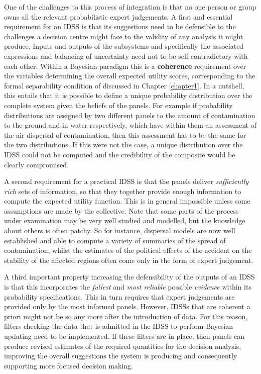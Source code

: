  One of the challenges to  this process of integration is that no one person or group owns all the relevant probabilistic expert judgements. A first and essential requirement for an IDSS is that its suggestions need to be defensible to the challenges a decision centre might face to the validity of any analysis it might produce. Inputs and outputs of the subsystems and specifically the associated expressions and balancing of uncertainty need not to be self contradictory with each other. Within a Bayesian paradigm this is a \textbf{coherence} requirement over the variables determining the overall expected utility scores, corresponding to the formal separability condition of \citet{Mahoney1996} discussed in Chapter \ref{chapter1}. In a nutshell, this entails that it is possible to define a unique probability distribution over the complete system given the beliefs of the panels. For example if  probability distributions are assigned by two different panels to the amount of contamination to the ground and in water respectively, which have within them an assessment of the air dispersal of contamination, then this assessment has to be the same for the two distributions. If this were not the case, a unique distribution over the IDSS could not be computed and the credibility of the composite would be clearly compromised. 

A second requirement for a practical IDSS is that the panels deliver \textit{sufficiently rich} sets of information, so that they together provide enough information to compute the expected utility function. This is in general impossible unless some assumptions are made by the collective. Note that some parts of the process under examination may be very well studied and modelled, but the knowledge about others is often patchy. So for instance, dispersal models are now well established and able to compute a variety of summaries  of the spread of contamination, whilst the estimates of the political effects of the accident on the stability of the affected regions often come only in the form of expert judgement.  

A third important property increasing the defensibility of the outputs of an IDSS is that this incorporates the \textit{fullest} and \textit{most reliable} possible \textit{evidence} within its probability specifications. This in turn requires that expert judgements are provided only by the most informed panels. However, IDSSs that are coherent a priori might not be so any more after the introduction of data. For this reason, filters checking the data that is admitted in the IDSS to perform Bayesian updating need to be implemented. If these filters are in place, then panels can produce revised estimates of the required quantities for the decision analysis, improving the overall suggestions the system is producing and consequently supporting more focused decision making. 


